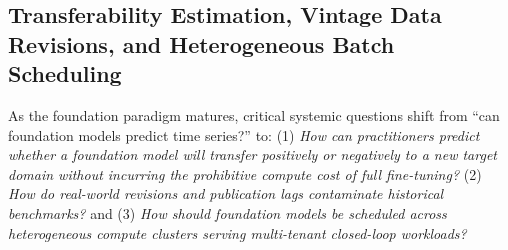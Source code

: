 \subsection{Transferability Estimation, Vintage Data Revisions, and Heterogeneous Batch Scheduling}
\label{sec:transferability_vintages_batch_scheduling}

As the foundation paradigm matures, critical systemic questions shift from ``can foundation models predict time series?'' to: (1) \emph{How can practitioners predict whether a foundation model will transfer positively or negatively to a new target domain without incurring the prohibitive compute cost of full fine-tuning?} (2) \emph{How do real-world revisions and publication lags contaminate historical benchmarks?} and (3) \emph{How should foundation models be scheduled across heterogeneous compute clusters serving multi-tenant closed-loop workloads?}

